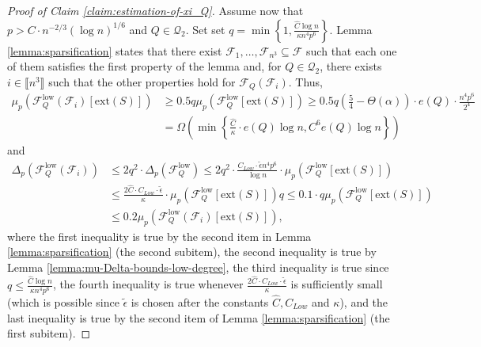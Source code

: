\documentclass[11pt,a4paper,oneside,reqno]{amsart}
\newcommand{\cF}{\mathcal{F}}
\newcommand{\cQ}{\mathcal{Q}}
\newcommand{\1}{\mathbbm{1}} %
\newcommand{\br}[1]{\llbracket{#1}\rrbracket}
\renewcommand{\le}{\leqslant}
\renewcommand{\ge}{\geqslant}
\newcommand{\cFQL}{\cF_Q^{\mathrm{low}}}
\newcommand{\ext}{\mathrm{ext}}
\begin{document}
\begin{proof}[Proof of Claim \ref{claim:estimation-of-xi_Q}]
    Assume now that $p > C \cdot n^{-2/3} \left(\log n\right)^{1/6}$ and $Q \in \cQ_2$. Set set $q = \min\left\{1, \frac{\hat{C} \log n}{\kappa n^4 p^6}\right\}$. Lemma \ref{lemma:sparsification} states that there exist $\cF_1, \dots, \cF_{n^3} \subseteq \cF$ such that each one of them satisfies the first property of the lemma and, for $Q \in \cQ_2$, there exists $i \in \br{n^3}$ such that the other properties hold for $\cF_Q(\cF_i)$. Thus,
    \begin{align*}
        \mu_p\left(\cFQL(\cF_i)\left[\ext(S)\right]\right) &\ge 0.5 q \mu_p\left(\cFQL\left[\ext(S)\right]\right) \ge 0.5 q \left(\frac{5}{4} - \Theta(\alpha)\right) \cdot e(Q) \cdot \frac{n^4 p^6}{2^4} \\&= \Omega\left(\min\left\{\frac{\hat{C}}{\kappa} \cdot e(Q) \log n, C^6 e(Q) \log n\right\}\right)
    \end{align*}
    and
    \begin{align*}
        \Delta_p\left(\cFQL(\cF_i)\right) &\le 2 q^2 \cdot \Delta_p\left(\cFQL\right) \le 2q^2 \cdot \frac{C_{Low} \cdot \tilde{\epsilon} n^4 p^6}{\log n} \cdot \mu_p\left(\cFQL\left[\ext(S)\right]\right) \\&\le \frac{2 \hat{C} \cdot C_{Low} \cdot \tilde{\epsilon}}{\kappa} \cdot \mu_p\left(\cFQL\left[\ext(S)\right]\right) q \le 0.1 \cdot q \mu_p\left(\cFQL\left[\ext(S)\right]\right) \\
        &\le 0.2 \mu_p\left(\cFQL(\cF_i)\left[\ext(S)\right]\right),
    \end{align*}
    where the first inequality is true by the second item in Lemma \ref{lemma:sparsification} (the second subitem), the second inequality is true by Lemma \ref{lemma:mu-Delta-bounds-low-degree}, the third inequality is true since $q \le \frac{\hat{C} \log n}{\kappa n^4 p^6}$, the fourth inequality is true whenever $\frac{2 \hat{C} \cdot C_{Low} \cdot \tilde{\epsilon}}{\kappa}$ is sufficiently small (which is possible since $\tilde{\epsilon}$ is chosen after the constants $\hat{C}, C_{Low}$ and $\kappa$), and the last inequality is true by the second item of Lemma \ref{lemma:sparsification} (the first subitem).


\end{proof}
\end{document}

